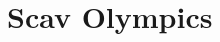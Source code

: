 \documentclass{book}
\begin{document}



\newpage
\setcounter{page}{1}
\pagestyle{empty}

\section*{Scav Olympics}
\end{document}
